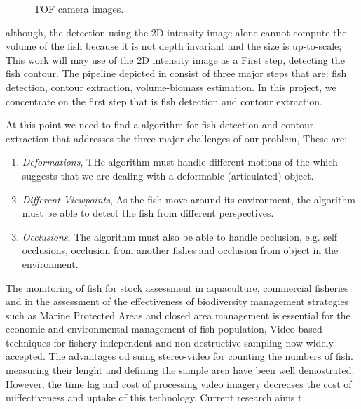 \begin{figure}[h]
\centering
{}
{}%
\caption{TOF camera images.}
\label{fig:tofNoisy}
\end{figure}

although, the detection using the 2D intensity image alone cannot compute the volume
of the fish because it is not depth invariant and the size is up-to-scale; This work 
will may use of the 2D intensity image as a First step, detecting the fish contour.
The pipeline depicted in  consist of three major steps
that are: fish detection, contour extraction, volume-biomass estimation. In this 
project, we concentrate on the first step that is fish detection and contour extraction.

At this point we need to find a algorithm for fish detection and contour extraction 
that addresses the three major challenges of our problem, These are:

\begin{enumerate}
\item \textit{Deformations}, THe algorithm must handle different motions of the
which suggests that we are dealing with a deformable (articulated) object.
\item \textit{Different Viewpoints}, As the fish move around its environment, the 
algorithm must be able to detect the fish from different perspectives.
\item \textit{Occlusions}, The algorithm must also be able to handle occlusion, 
e.g. self occlusions, occlusion from another fishes and occlusion from object in 
the environment.
\end{enumerate}
The monitoring of fish for stock assessment in aquaculture,
commercial fisheries and in the assessment of the effectiveness of biodiversity 
management strategies such as Marine Protected Areas and closed area management 
is essential for the economic and environmental management of fish population,
Video based techniques for fishery independent and non-destructive sampling now 
widely accepted.
The advantages od suing stereo-video for counting the numbers of fish. measuring 
their lenght and defining the sample area have been well demostrated.
However, the time lag and cost of processing video imagery decreases the cost of 
miffectiveness and uptake of this technology. Current research aims t
	


